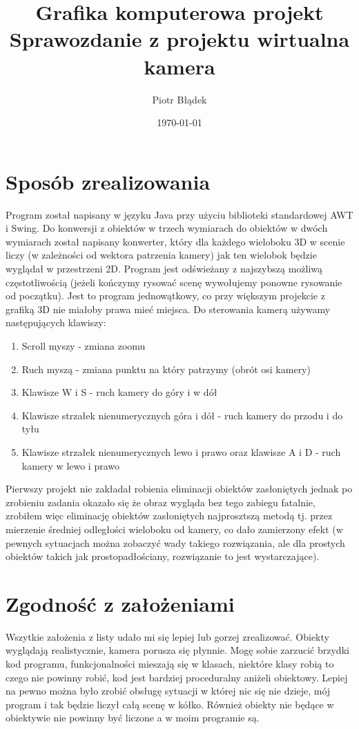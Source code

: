 \documentclass[a4paper,11pt,notitlepage]{article}
\author{Piotr Błądek}
\title{Grafika komputerowa projekt \\ Sprawozdanie z projektu wirtualna kamera}
\date{\today}
\begin{document}
\maketitle

\section{Sposób zrealizowania}

Program został napisany w języku Java przy użyciu biblioteki standardowej AWT i Swing. Do konwersji z obiektów w trzech wymiarach do obiektów w dwóch wymiarach został napisany konwerter, który dla każdego wieloboku 3D w scenie liczy (w zależności od wektora patrzenia kamery) jak ten wielobok będzie wyglądał w przestrzeni 2D. Program jest odświeżany z najszybszą możliwą częstotliwością (jeżeli kończymy rysować scenę wywołujemy ponowne rysowanie od początku). Jest to program jednowątkowy, co przy większym projekcie z grafiką 3D nie miałoby prawa mieć miejsca. Do sterowania kamerą używamy następujących klawiszy:

\begin{enumerate}
 \item Scroll myszy - zmiana zoomu
 \item Ruch myszą - zmiana punktu na który patrzymy (obrót osi kamery)
 \item Klawisze W i S - ruch kamery do góry i w dół
 \item Klawisze strzałek nienumerycznych góra i dół - ruch kamery do przodu i do tyłu
 \item Klawisze strzałek nienumerycznych lewo i prawo oraz klawisze A i D - ruch kamery w lewo i prawo
\end{enumerate}

Pierwszy projekt nie zakładał robienia eliminacji obiektów zasłoniętych jednak po zrobieniu zadania okazało się że obraz wygląda bez tego zabiegu fatalnie, zrobiłem więc eliminację obiektów zasłoniętych najprosztszą metodą tj. przez mierzenie średniej odległości wieloboku od kamery, co dało zamierzony efekt (w pewnych sytuacjach można zobaczyć wady takiego rozwiązania, ale dla prostych obiektów takich jak prostopadłościany, rozwiązanie to jest wystarczające).

\section{Zgodność z założeniami}

Wszytkie założenia z listy udało mi się lepiej lub gorzej zrealizować. Obiekty wyglądają realistycznie, kamera porusza się płynnie. Mogę sobie zarzucić brzydki kod programu, funkcjonalności mieszają się w klasach, niektóre klasy robią to czego nie powinny robić, kod jest bardziej proceduralny aniżeli obiektowy. Lepiej na pewno można było zrobić obsługę sytuacji w której nic się nie dzieje, mój program i tak będzie liczył całą scenę w kółko. Również obiekty nie będące w obiektywie nie powinny być liczone a w moim programie są.
\end{document}
